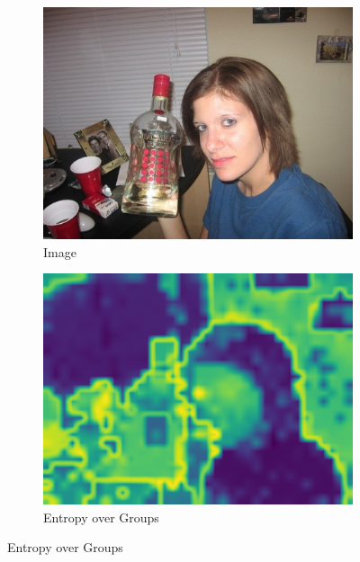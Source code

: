 \begin{figure}[t]
\centering


\begin{subfigure}{0.32\textwidth}
    \centering
    \includegraphics[width=\linewidth]{Images/0009.jpg}
    \caption{Image}
\end{subfigure}
\hfill
\begin{subfigure}{0.32\textwidth}
    \centering
    \includegraphics[width=\linewidth]{Images/entropymaps/entropy_mapwithoutcb.png}
    \caption{Entropy over Groups}
    

\end{subfigure}
\end{figure}
